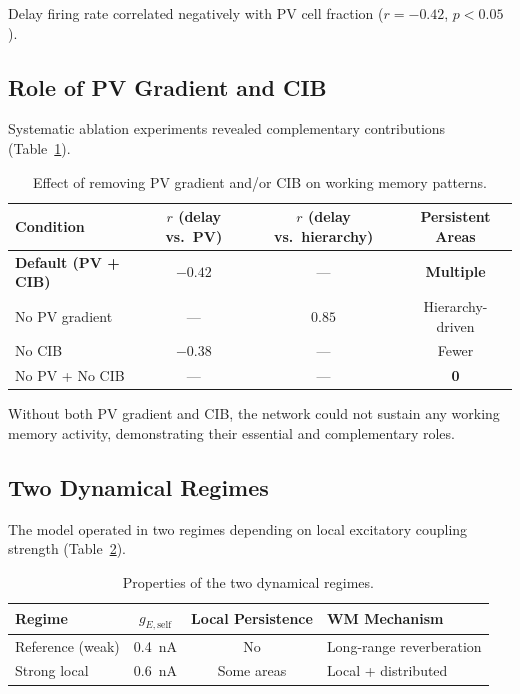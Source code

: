 \documentclass[11pt]{article}
\begin{document}
Delay firing rate correlated negatively with PV cell fraction ($r = -0.42$, $p < 0.05$).

\subsection{Role of PV Gradient and CIB}

Systematic ablation experiments revealed complementary contributions (Table~\ref{tab:ablation}).

\begin{table}[H]
\centering
\caption{Effect of removing PV gradient and/or CIB on working memory patterns.}
\label{tab:ablation}
\begin{tabular}{@{}lccc@{}}
\toprule
Condition & $r$ (delay vs.\ PV) & $r$ (delay vs.\ hierarchy) & Persistent Areas \\
\midrule
\textbf{Default (PV + CIB)} & $\mathbf{-0.42}$ & --- & \textbf{Multiple} \\
No PV gradient & --- & $0.85$ & Hierarchy-driven \\
No CIB & $-0.38$ & --- & Fewer \\
No PV + No CIB & --- & --- & \textbf{0} \\
\bottomrule
\end{tabular}
\end{table}

Without both PV gradient and CIB, the network could not sustain any working memory activity, demonstrating their essential and complementary roles.

\subsection{Two Dynamical Regimes}

The model operated in two regimes depending on local excitatory coupling strength (Table~\ref{tab:regimes}).

\begin{table}[H]
\centering
\caption{Properties of the two dynamical regimes.}
\label{tab:regimes}
\begin{tabular}{@{}lccl@{}}
\toprule
Regime & $g_{E,\text{self}}$ & Local Persistence & WM Mechanism \\
\midrule
Reference (weak) & 0.4~nA & No & Long-range reverberation \\
Strong local & 0.6~nA & Some areas & Local + distributed \\
\bottomrule
\end{tabular}
\end{table}
\end{document}
